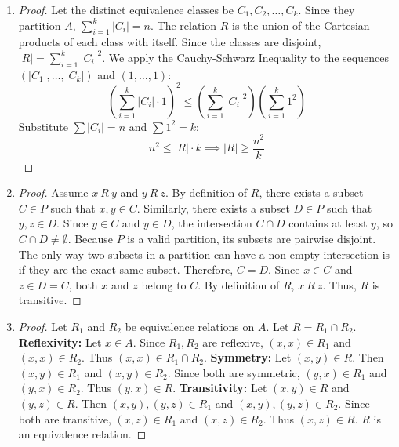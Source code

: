 \documentclass[11pt, a4paper]{article}
\theoremstyle{definition}
\theoremstyle{remark}
\begin{document}
\begin{enumerate}[label=\textbf{\arabic*.}, leftmargin=*]
    \item \begin{proof}
    Let the distinct equivalence classes be $C_1, C_2, \dots, C_k$. Since they partition $A$, $\sum_{i=1}^k |C_i| = n$.
    The relation $R$ is the union of the Cartesian products of each class with itself. Since the classes are disjoint, $|R| = \sum_{i=1}^k |C_i|^2$.
    We apply the Cauchy-Schwarz Inequality to the sequences $(|C_1|, \dots, |C_k|)$ and $(1, \dots, 1)$:
    \[ \left( \sum_{i=1}^k |C_i| \cdot 1 \right)^2 \le \left( \sum_{i=1}^k |C_i|^2 \right) \left( \sum_{i=1}^k 1^2 \right) \]
    Substitute $\sum |C_i| = n$ and $\sum 1^2 = k$:
    \[ n^2 \le |R| \cdot k \implies |R| \ge \frac{n^2}{k} \]
    \end{proof}

    \item \begin{proof}
    Assume $x \ R \ y$ and $y \ R \ z$. By definition of $R$, there exists a subset $C \in P$ such that $x, y \in C$. Similarly, there exists a subset $D \in P$ such that $y, z \in D$.
    Since $y \in C$ and $y \in D$, the intersection $C \cap D$ contains at least $y$, so $C \cap D \neq \emptyset$.
    Because $P$ is a valid partition, its subsets are pairwise disjoint. The only way two subsets in a partition can have a non-empty intersection is if they are the exact same subset. Therefore, $C = D$.
    Since $x \in C$ and $z \in D = C$, both $x$ and $z$ belong to $C$. By definition of $R$, $x \ R \ z$. Thus, $R$ is transitive.
    \end{proof}

    \item \begin{proof}
    Let $R_1$ and $R_2$ be equivalence relations on $A$. Let $R = R_1 \cap R_2$.
    \textbf{Reflexivity:} Let $x \in A$. Since $R_1, R_2$ are reflexive, $(x, x) \in R_1$ and $(x, x) \in R_2$. Thus $(x, x) \in R_1 \cap R_2$.
    \textbf{Symmetry:} Let $(x, y) \in R$. Then $(x, y) \in R_1$ and $(x, y) \in R_2$. Since both are symmetric, $(y, x) \in R_1$ and $(y, x) \in R_2$. Thus $(y, x) \in R$.
    \textbf{Transitivity:} Let $(x, y) \in R$ and $(y, z) \in R$. Then $(x, y), (y, z) \in R_1$ and $(x, y), (y, z) \in R_2$. Since both are transitive, $(x, z) \in R_1$ and $(x, z) \in R_2$. Thus $(x, z) \in R$. $R$ is an equivalence relation.
    \end{proof}


\end{enumerate}
\end{document}
